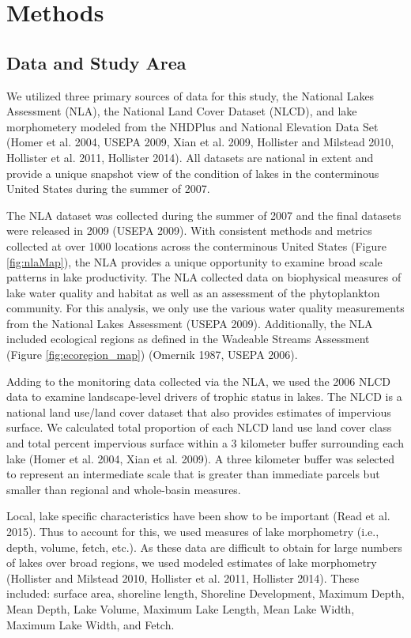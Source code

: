 \documentclass[12pt,]{article}
\begin{document}
\section{Methods}\label{methods}

\subsection{Data and Study Area}\label{data-and-study-area}

We utilized three primary sources of data for this study, the National
Lakes Assessment (NLA), the National Land Cover Dataset (NLCD), and lake
morphometery modeled from the NHDPlus and National Elevation Data Set
(Homer et al. 2004, USEPA 2009, Xian et al. 2009, Hollister and Milstead
2010, Hollister et al. 2011, Hollister 2014). All datasets are national
in extent and provide a unique snapshot view of the condition of lakes
in the conterminous United States during the summer of 2007.

The NLA dataset was collected during the summer of 2007 and the final
datasets were released in 2009 (USEPA 2009). With consistent methods and
metrics collected at over 1000 locations across the conterminous United
States (Figure \ref{fig:nlaMap}), the NLA provides a unique opportunity
to examine broad scale patterns in lake productivity. The NLA collected
data on biophysical measures of lake water quality and habitat as well
as an assessment of the phytoplankton community. For this analysis, we
only use the various water quality measurements from the National Lakes
Assessment (USEPA 2009). Additionally, the NLA included ecological
regions as defined in the Wadeable Streams Assessment (Figure
\ref{fig:ecoregion_map}) (Omernik 1987, USEPA 2006).

Adding to the monitoring data collected via the NLA, we used the 2006
NLCD data to examine landscape-level drivers of trophic status in lakes.
The NLCD is a national land use/land cover dataset that also provides
estimates of impervious surface. We calculated total proportion of each
NLCD land use land cover class and total percent impervious surface
within a 3 kilometer buffer surrounding each lake (Homer et al. 2004,
Xian et al. 2009). A three kilometer buffer was selected to represent an
intermediate scale that is greater than immediate parcels but smaller
than regional and whole-basin measures.

Local, lake specific characteristics have been show to be important
(Read et al. 2015). Thus to account for this, we used measures of lake
morphometry (i.e., depth, volume, fetch, etc.). As these data are
difficult to obtain for large numbers of lakes over broad regions, we
used modeled estimates of lake morphometry (Hollister and Milstead 2010,
Hollister et al. 2011, Hollister 2014). These included: surface area,
shoreline length, Shoreline Development, Maximum Depth, Mean Depth, Lake
Volume, Maximum Lake Length, Mean Lake Width, Maximum Lake Width, and
Fetch.
\end{document}
